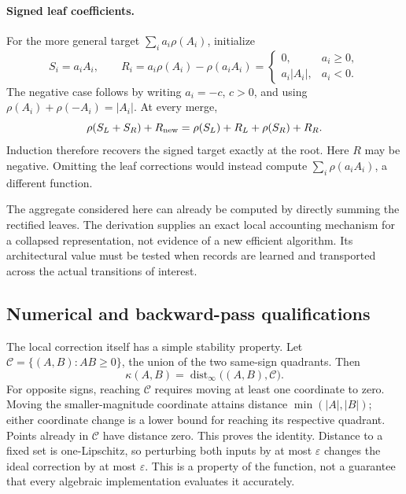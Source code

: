 \paragraph{Signed leaf coefficients.}
For the more general target $\sum_i a_i\rho(A_i)$, initialize
\begin{equation}
 S_i=a_iA_i,\qquad
 R_i=a_i\rho(A_i)-\rho(a_iA_i)
 =\begin{cases}0,&a_i\ge0,\\a_i|A_i|,&a_i<0.\end{cases}
 \label{loc:signed_leaf}
\end{equation}
The negative case follows by writing $a_i=-c$, $c>0$, and using
$\rho(A_i)+\rho(-A_i)=|A_i|$. At every merge,
\[
 \rho(S_L+S_R)+R_{\rm new}
 =\rho(S_L)+R_L+\rho(S_R)+R_R.
\]
Induction therefore recovers the signed target exactly at the root. Here
$R$ may be negative. Omitting the leaf corrections would instead compute
$\sum_i\rho(a_iA_i)$, a different function.

The aggregate considered here can already be computed by directly summing
the rectified leaves. The derivation supplies an exact local accounting
mechanism for a collapsed representation, not evidence of a new efficient
algorithm. Its architectural value must be tested when records are learned
and transported across the actual transitions of interest.

\subsection{Numerical and backward-pass qualifications}
\label{loc:implementation}

The local correction itself has a simple stability property. Let
$\mathcal C=\{(A,B):AB\ge0\}$, the union of the two same-sign quadrants.
Then
\begin{equation}
 \kappa(A,B)=\operatorname{dist}_{\infty}\bigl((A,B),\mathcal C\bigr).
 \label{loc:distance}
\end{equation}
For opposite signs, reaching $\mathcal C$ requires moving at least one
coordinate to zero. Moving the smaller-magnitude coordinate attains
distance $\min(|A|,|B|)$; either coordinate change is a lower bound for
reaching its respective quadrant. Points already in $\mathcal C$ have
distance zero. This proves the identity. Distance to a fixed set is
one-Lipschitz, so perturbing both inputs by at most $\varepsilon$ changes
the ideal correction by at most $\varepsilon$. This is a property of the
function, not a guarantee that every algebraic implementation evaluates it
accurately.


